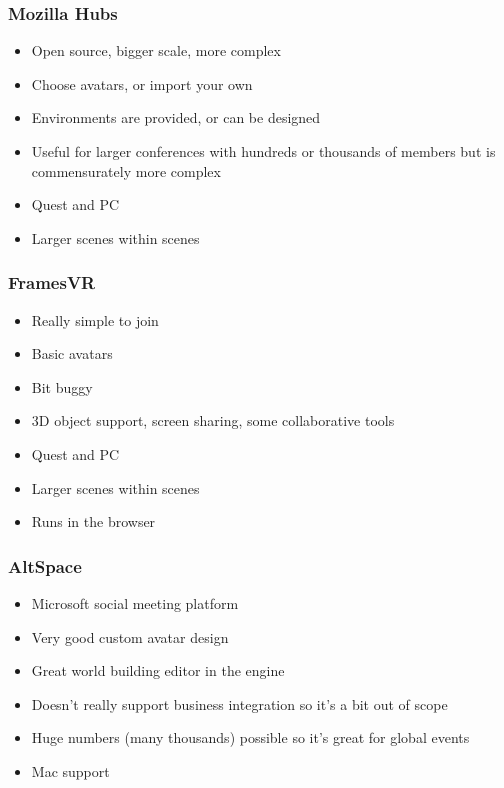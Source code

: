 \subsubsection{Mozilla Hubs}
\begin{itemize}
\item Open source, bigger scale, more complex
\item Choose avatars, or import your own
\item Environments are provided, or can be designed
\item Useful for larger conferences with hundreds or thousands of members but is commensurately more complex
\item Quest and PC
\item Larger scenes within scenes
\end{itemize}
\subsubsection{FramesVR}
\begin{itemize}
\item Really simple to join
\item Basic avatars
\item Bit buggy
\item 3D object support, screen sharing, some collaborative tools
\item Quest and PC
\item Larger scenes within scenes
\item Runs in the browser
\end{itemize}
\subsubsection{AltSpace}
\begin{itemize}
\item Microsoft social meeting platform
\item Very good custom avatar design
\item Great world building editor in the engine
\item Doesn't really support business integration so it's a bit out of scope
\item Huge numbers (many thousands) possible so it's great for global events
\item Mac support
\end{itemize}
